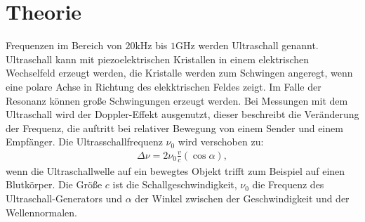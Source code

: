 \section{Theorie}
\label{sec:Theorie}
Frequenzen im Bereich von $20 \si{\kilo\hertz}$ bis $1 \si{\giga\hertz}$ werden Ultraschall genannt.
Ultraschall kann mit piezoelektrischen Kristallen in einem elektrischen Wechselfeld erzeugt werden, die
Kristalle werden zum Schwingen angeregt, wenn eine polare Achse in Richtung des elekktrischen Feldes zeigt.
Im Falle der Resonanz können große Schwingungen erzeugt werden.
Bei Messungen mit dem Ultraschall wird der Doppler-Effekt ausgenutzt, dieser beschreibt die Veränderung der
Frequenz, die auftritt bei relativer Bewegung von einem Sender und einem Empfänger.
Die Ultrasschallfrequenz $\nu_0$ wird verschoben zu:
\begin{align}
 \Delta \nu =2\nu_0 \frac{v}{c}(\cos{\alpha}),
\end{align}
wenn die Ultraschallwelle auf ein bewegtes Objekt trifft zum Beispiel auf einen Blutkörper.
Die Größe $c$ ist die Schallgeschwindigkeit, $\nu_0$ die Frequenz des Ultraschall-Generators und $\alpha$ der Winkel
zwischen der Geschwindigkeit und der Wellennormalen.

